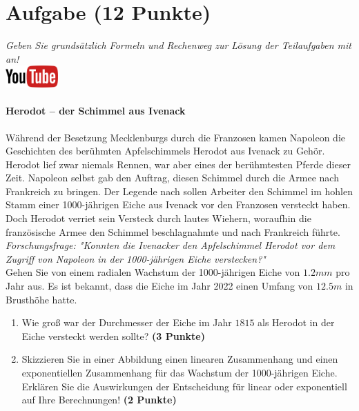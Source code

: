 \documentclass[a4paper, 10pt]{scrartcl}\usepackage[]{graphicx}\usepackage[]{xcolor}
\begin{document}
\section{Aufgabe \hfill (12 Punkte)}

\textit{Geben Sie grunds{\"a}tzlich Formeln und Rechenweg zur L{\"o}sung der
  Teilaufgaben mit an!} \\[1Ex]

\hfill\href{https://youtu.be/Fu8kN0Uj13Y}{\includegraphics[width =
  2cm]{img/youtube}} %
\hspace{2Ex}

\paragraph{Herodot – der Schimmel aus Ivenack}

W{\"a}hrend der Besetzung Mecklenburgs durch die Franzosen kamen Napoleon die
Geschichten des ber{\"u}hmten Apfelschimmels Herodot aus Ivenack zu
Geh{\"o}r. Herodot lief zwar niemals Rennen, war aber eines der ber{\"u}hmtesten
Pferde dieser Zeit. Napoleon selbst gab den Auftrag, diesen
Schimmel durch die Armee nach Frankreich zu bringen. Der Legende nach
sollen Arbeiter den Schimmel im hohlen Stamm einer 1000-j{\"a}hrigen Eiche aus Ivenack vor
den Franzosen versteckt haben. Doch Herodot verriet sein Versteck durch
lautes Wiehern, woraufhin die franz{\"o}sische Armee den Schimmel
beschlagnahmte und nach Frankreich f{\"u}hrte. \\



\textit{Forschungsfrage: "Konnten die Ivenacker den Apfelschimmel Herodot
  vor dem Zugriff von Napoleon in der 1000-j{\"a}hrigen Eiche verstecken?"} \\

Gehen Sie von einem radialen Wachstum der 1000-j{\"a}hrigen Eiche von
$1.2mm$ pro Jahr aus. Es ist bekannt, dass die Eiche im
Jahr 2022 einen Umfang von $12.5m$ in Brusth{\"o}he hatte.

\begin{enumerate}
\item Wie gro{\ss} war der Durchmesser der Eiche im Jahr $1815$ als
  Herodot in der Eiche versteckt werden sollte?
  \textbf{(3 Punkte)}
\item Skizzieren Sie in einer Abbildung einen linearen Zusammenhang und einen
exponentiellen Zusammenhang f{\"u}r das Wachstum der 1000-j{\"a}hrigen Eiche. Erkl{\"a}ren Sie die
Auswirkungen der Entscheidung f{\"u}r linear oder exponentiell auf Ihre
Berechnungen! \textbf{(2 Punkte)}
\end{enumerate}
 
\end{document}
